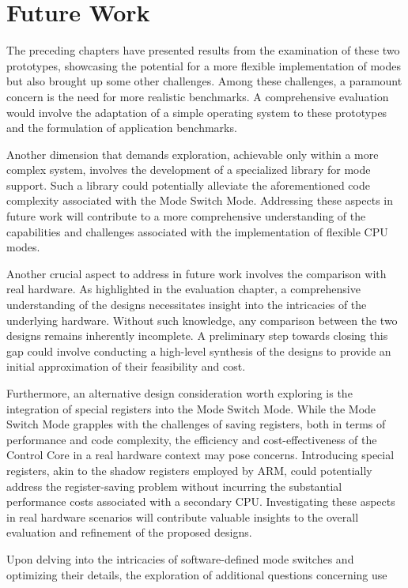 \chapter{Future Work}
The preceding chapters have presented results from the examination of these two
prototypes, showcasing the potential for a more flexible implementation of
modes but also brought up some other challenges. Among these challenges, a paramount
concern is the need for more realistic benchmarks. A comprehensive evaluation
would involve the adaptation of a simple operating system to these prototypes
and the formulation of application benchmarks.\par
Another dimension that demands exploration, achievable only within a more
complex system, involves the development of a specialized library for mode
support. Such a library could potentially alleviate the aforementioned code
complexity associated with the Mode Switch Mode. Addressing these aspects in
future work will contribute to a more comprehensive understanding of the
capabilities and challenges associated with the implementation of flexible CPU
modes.\par
Another crucial aspect to address in future work involves the comparison with
real hardware. As highlighted in the evaluation chapter, a comprehensive
understanding of the designs necessitates insight into the intricacies of the
underlying hardware. Without such knowledge, any comparison between the two
designs remains inherently incomplete. A preliminary step towards closing this
gap could involve conducting a high-level synthesis of the designs to provide an
initial approximation of their feasibility and cost.\par
Furthermore, an alternative design consideration worth exploring is the
integration of special registers into the Mode Switch Mode. While the Mode
Switch Mode grapples with the challenges of saving registers, both in terms of
performance and code complexity, the efficiency and cost-effectiveness of the Control
Core in a real hardware context may pose concerns. Introducing special
registers, akin to the shadow registers employed by ARM, could potentially
address the register-saving problem without incurring the substantial
performance costs associated with a secondary CPU. Investigating these aspects
in real hardware scenarios will contribute valuable insights to the overall
evaluation and refinement of the proposed designs.\par
Upon delving into the intricacies of software-defined mode switches and
optimizing their details, the exploration of additional questions concerning use

